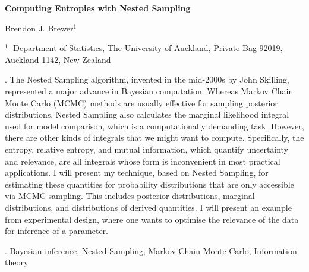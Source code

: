 \documentclass[12pt]{article}
\begin{document}
\begin{flushleft}


{\LARGE\bf Computing Entropies with Nested Sampling}


\vspace{1.0cm}

Brendon J. Brewer$^1$

\begin{description}

\item $^1 \;$ Department of Statistics, The University of Auckland,
Private Bag 92019, Auckland 1142, New Zealand

\end{description}

\end{flushleft}


\vspace{0.75cm}

. The Nested Sampling algorithm, invented in the
mid-2000s by John Skilling, represented a major advance in Bayesian computation.
Whereas Markov Chain Monte Carlo (MCMC) methods are usually effective for sampling
posterior distributions, Nested Sampling also calculates the marginal likelihood
integral used for model comparison, which is a computationally demanding task.
However, there are other kinds of integrals that we might want to compute.
Specifically, the entropy, relative entropy, and mutual information,
which quantify uncertainty and relevance, are all integrals whose form is
inconvenient in most practical applications. I will present my technique,
based on Nested Sampling, for estimating these quantities for probability
distributions that are only accessible via MCMC sampling.
This includes posterior
distributions, marginal distributions, and distributions of derived quantities.
I will present an example from experimental design, where one wants to
optimise the relevance of the data for inference of a parameter.

\vskip 2mm

.
Bayesian inference, Nested Sampling, Markov Chain Monte Carlo,
Information theory
\end{document}

